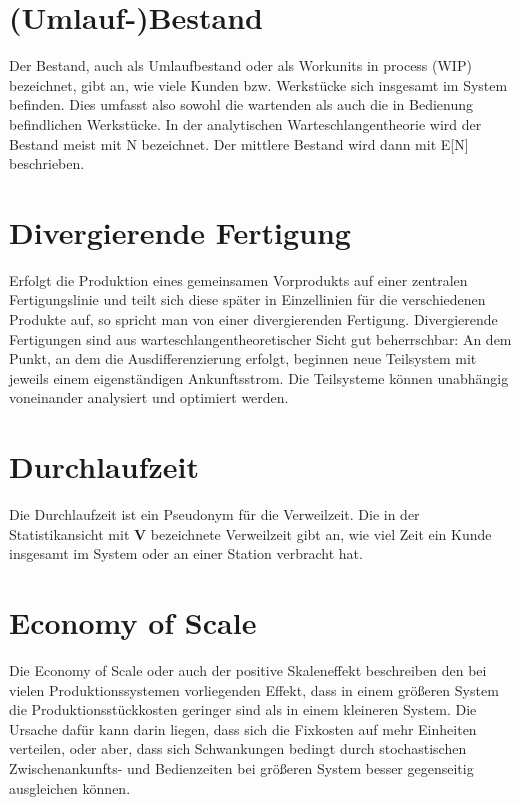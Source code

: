 \section*{(Umlauf-)Bestand}


Der Bestand, auch als Umlaufbestand oder als Workunits in process (WIP) bezeichnet,
gibt an, wie viele Kunden bzw. Werkstücke sich insgesamt im System befinden. Dies umfasst
also sowohl die wartenden als auch die in Bedienung befindlichen Werkstücke.
In der analytischen Warteschlangentheorie wird der
Bestand meist mit N bezeichnet. Der mittlere Bestand wird dann mit E[N] beschrieben.

\section*{Divergierende Fertigung}


Erfolgt die Produktion eines gemeinsamen Vorprodukts auf einer zentralen Fertigungslinie
und teilt sich diese später in Einzellinien für die verschiedenen Produkte auf, so spricht
man von einer divergierenden Fertigung. Divergierende Fertigungen sind aus
warteschlangentheoretischer Sicht gut beherrschbar: An dem Punkt, an dem die Ausdifferenzierung erfolgt, beginnen neue
Teilsystem mit jeweils einem eigenständigen Ankunftsstrom. Die Teilsysteme können unabhängig
voneinander analysiert und optimiert werden.

\section*{Durchlaufzeit}


Die Durchlaufzeit ist ein Pseudonym für die Verweilzeit.
Die in der Statistikansicht mit \textbf{V} bezeichnete Verweilzeit
gibt an, wie viel Zeit ein Kunde insgesamt im System oder an einer Station verbracht hat.

\section*{Economy of Scale}


Die Economy of Scale oder auch der positive Skaleneffekt beschreiben den bei vielen Produktionssystemen
vorliegenden Effekt, dass in einem größeren System die Produktionsstückkosten geringer sind als in
einem kleineren System. Die Ursache dafür kann darin liegen, dass sich die Fixkosten auf mehr Einheiten
verteilen, oder aber, dass sich Schwankungen bedingt durch stochastischen Zwischenankunfts- und Bedienzeiten
bei größeren System besser gegenseitig ausgleichen können.

